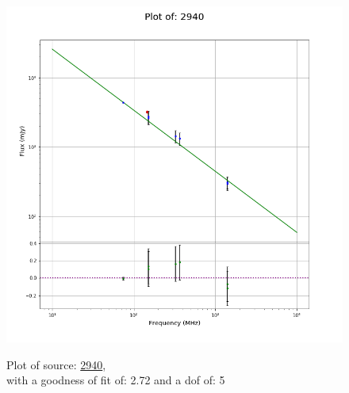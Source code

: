 \documentclass{article}
\begin{document}
\begin{figure}[H]
    \centering
    \begin{minipage}{.5\textwidth}
        \centering
        \includegraphics[scale = 0.35]{KmeulenTrap4P23_1hr/1hr2940.png}
        \captionsetup{labelformat=empty}
        \caption{Plot of source: \href{http://banana.transientskp.org/r4/vlo_KmeulenTrap4P23/runningcatalog/2940}{2940},\\with a goodness of fit of: 2.72 and a dof of: 5}
        \addtocounter{figure}{-1}
        \label{KmeulenTrap4P23:1hr:2940:plot}
    \end{minipage}%
    \begin{minipage}{0.5\textwidth}
        \centering


\end{minipage}
\end{figure}
\end{document}
